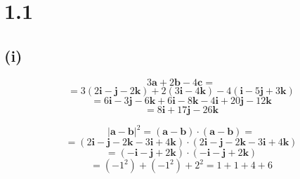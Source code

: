 \documentclass{article}
\begin{document}
\section*{1.1}

\subsection*{(i)}
\begin{equation*}
    3 \textbf{a} + 2 \textbf{b} - 4 \textbf{c} = 
\end{equation*}
\begin{equation*}
    = 3(2 \textbf{i} - \textbf{j} - 2 \textbf{k}) + 2(3 \textbf{i} - 4 \textbf{k}) - 4(\textbf{i} - 5 \textbf{j} + 3 \textbf{k})
\end{equation*}
\begin{equation*}
    = 6\textbf{i} - 3\textbf{j} - 6\textbf{k} + 6\textbf{i} - 8\textbf{k} - 4\textbf{i} + 20\textbf{j} - 12\textbf{k}
\end{equation*}
\begin{equation*}
    = 8\textbf{i} + 17\textbf{j} -26\textbf{k}
\end{equation*}

\begin{equation*}
    |\textbf{a} - \textbf{b}|^2 = (\textbf{a} - \textbf{b}) \cdot (\textbf{a} - \textbf{b}) = 
\end{equation*}
\begin{equation*}
    = (2\textbf{i} - \textbf{j} -2\textbf{k} - 3\textbf{i} + 4\textbf{k}) \cdot (2\textbf{i} - \textbf{j} -2\textbf{k} - 3\textbf{i} + 4\textbf{k})
\end{equation*}
\begin{equation*}
    = (- \textbf{i} - \textbf{j} +2 \textbf{k} ) \cdot (- \textbf{i} - \textbf{j} +2 \textbf{k} )
\end{equation*}
\begin{equation*}
    = (-1^2) + (-1^2) + 2^2 = 1 + 1 + 4 + 6
\end{equation*}
\end{document}
